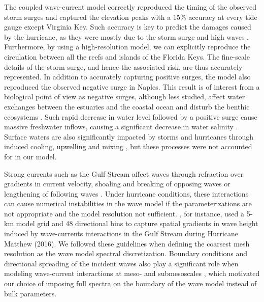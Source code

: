 The coupled wave-current model correctly reproduced the timing of the observed storm surges and captured the elevation peaks with a 15\% accuracy at every tide gauge except Virginia Key. Such accuracy is key to predict the damages caused by the hurricane, as they were mostly due to the storm surge and  high waves \citep{xian2018brief}. Furthermore, by using a high-resolution model, we can explicitly reproduce the circulation between all the reefs and islands of the Florida Keys. The fine-scale details of the storm surge, and hence the associated risk, are thus accurately represented. In addition to accurately capturing positive surges, the model also reproduced the observed negative surge in Naples. This result is of interest from a biological point of view as negative surges, although less studied, affect water exchanges between the estuaries and the coastal ocean and disturb the benthic ecosystems \citep{liu2020impacts}. Such rapid decrease in water level followed by a positive surge cause massive freshwater inflows, causing a significant decrease in water salinity \citep{wachnicka2019hurricane}. Surface waters are also significantly impacted by storms and hurricanes through induced cooling, upwelling and mixing \citep{varlas2020investigating}, but these processes were not accounted for in our model.

Strong currents such as the Gulf Stream affect waves through refraction over gradients in current velocity, shoaling and breaking of opposing waves or lengthening of following waves \citep{hegermiller2019wave}. Under hurricane conditions, these interactions can cause numerical instabilities in the wave model if the parameterizations are not appropriate and the model resolution not sufficient. \cite{hegermiller2019wave}, for instance, used a 5-km model grid and 48 directional bins to capture spatial gradients in wave height induced by wave-currents interactions in the Gulf Stream during Hurricane Matthew (2016). We followed these guidelines when defining the coarsest mesh resolution as the wave model spectral discretization. Boundary conditions and directional spreading of the incident waves also play a significant role when modeling wave-current interactions at meso- and submesoscales \citep{villas2020wave}, which motivated our choice of imposing full spectra on the boundary of the wave model instead of bulk parameters.

